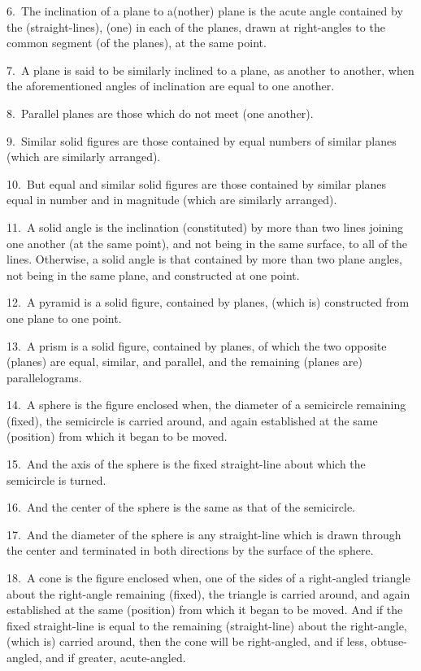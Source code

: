 \begin{Parallel}{}{}
{6.~The inclination of a plane to a(nother) plane is the  acute angle
contained by the (straight-lines), (one)  in each of the planes, drawn at right-angles to the common segment
(of the planes), at the same point.

7.~A plane is said to be similarly inclined to a plane,
as another  to  another, when the aforementioned angles
of inclination are equal to one another.

8.~Parallel planes are those which do not meet (one another).

9.~Similar solid figures are those contained by equal numbers of similar
planes (which are similarly arranged).

10.~But equal and similar solid figures are those contained
by similar planes equal in number and in magnitude (which are similarly arranged).

11.~A solid angle is the inclination (constituted) by more than two lines joining one another (at the same point), and
not being in the same surface, to all of the lines. Otherwise,
a solid angle is that contained by more than two plane angles, not being
in the same plane, and constructed at one point.

12.~A pyramid is a solid figure, contained by planes, (which is) constructed from one plane to
one  point.

13.~A prism is a solid figure, contained by planes, of which the two opposite
(planes)
are equal, similar, and parallel, and the remaining (planes are) parallelograms.

14.~A sphere is the figure enclosed when, the diameter of a semicircle remaining (fixed), the semicircle is carried around,
 and  again established at the same (position) from which it began to be moved.
 
15.~And the axis of the sphere is the fixed straight-line about
 which the semicircle is turned.
 
16.~And the center of the sphere is the same as that of the semicircle.

17.~And the diameter of the sphere is any straight-line which is
 drawn through the center and terminated in both directions by
 the surface of the sphere.
 
18.~A cone is the figure enclosed when,  one of the sides of a right-angled triangle about the right-angle remaining (fixed),
  the triangle is carried around, and again established at the
 same (position) from which it began to be moved. And if the
 fixed straight-line is equal to the remaining (straight-line) about the
 right-angle, (which is) carried around, then the cone will be right-angled, and
 if less, obtuse-angled, and if greater, acute-angled.
 
}
\end{Parallel}
